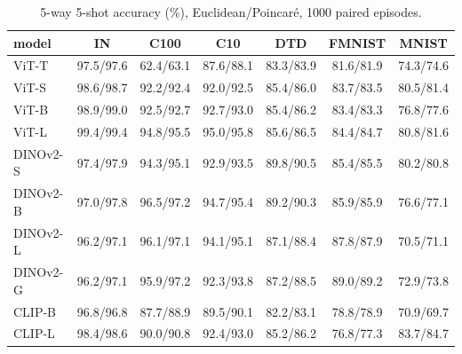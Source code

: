 \begin{table}[H]
\centering
\small
\begin{tabular}{lcccccc}
\toprule
model & IN & C100 & C10 & DTD & FMNIST & MNIST \\
\midrule
ViT-T & 97.5/97.6 & 62.4/63.1 & 87.6/88.1 & 83.3/83.9 & 81.6/81.9 & 74.3/74.6 \\
ViT-S & 98.6/98.7 & 92.2/92.4 & 92.0/92.5 & 85.4/86.0 & 83.7/83.5 & 80.5/81.4 \\
ViT-B & 98.9/99.0 & 92.5/92.7 & 92.7/93.0 & 85.4/86.2 & 83.4/83.3 & 76.8/77.6 \\
ViT-L & 99.4/99.4 & 94.8/95.5 & 95.0/95.8 & 85.6/86.5 & 84.4/84.7 & 80.8/81.6 \\
DINOv2-S & 97.4/97.9 & 94.3/95.1 & 92.9/93.5 & 89.8/90.5 & 85.4/85.5 & 80.2/80.8 \\
DINOv2-B & 97.0/97.8 & 96.5/97.2 & 94.7/95.4 & 89.2/90.3 & 85.9/85.9 & 76.6/77.1 \\
DINOv2-L & 96.2/97.1 & 96.1/97.1 & 94.1/95.1 & 87.1/88.4 & 87.8/87.9 & 70.5/71.1 \\
DINOv2-G & 96.2/97.1 & 95.9/97.2 & 92.3/93.8 & 87.2/88.5 & 89.0/89.2 & 72.9/73.8 \\
CLIP-B & 96.8/96.8 & 87.7/88.9 & 89.5/90.1 & 82.2/83.1 & 78.8/78.9 & 70.9/69.7 \\
CLIP-L & 98.4/98.6 & 90.0/90.8 & 92.4/93.0 & 85.2/86.2 & 76.8/77.3 & 83.7/84.7 \\
\bottomrule
\end{tabular}
\caption{5-way 5-shot accuracy (\%), Euclidean/Poincar\'e, 1000 paired episodes.}
\label{tab:a3}
\end{table}
